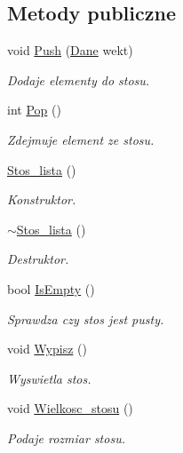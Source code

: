 \subsection*{\-Metody publiczne}
\begin{DoxyCompactItemize}
\item 
void \hyperlink{class_stos__lista_a0a12a6e3e6748a789e43934793917738}{\-Push} (\hyperlink{class_dane}{\-Dane} wekt)
\begin{DoxyCompactList}\small\item\em \-Dodaje elementy do stosu. \end{DoxyCompactList}\item 
int \hyperlink{class_stos__lista_a338593acee00448c8e9083b23363af63}{\-Pop} ()
\begin{DoxyCompactList}\small\item\em \-Zdejmuje element ze stosu. \end{DoxyCompactList}\item 
\hyperlink{class_stos__lista_ac7f453eea7c8f563d84068002c6c3d6d}{\-Stos\-\_\-lista} ()
\begin{DoxyCompactList}\small\item\em \-Konstruktor. \end{DoxyCompactList}\item 
\hyperlink{class_stos__lista_a2ea239a1b5c70eec5b5ae7fc770bf15a}{$\sim$\-Stos\-\_\-lista} ()
\begin{DoxyCompactList}\small\item\em \-Destruktor. \end{DoxyCompactList}\item 
bool \hyperlink{class_stos__lista_ac4a0dce20a28da4c373aeba1e3dc7524}{\-Is\-Empty} ()
\begin{DoxyCompactList}\small\item\em \-Sprawdza czy stos jest pusty. \end{DoxyCompactList}\item 
void \hyperlink{class_stos__lista_aff392523f7f8b2bad0d8da0d62fa8bac}{\-Wypisz} ()
\begin{DoxyCompactList}\small\item\em \-Wyswietla stos. \end{DoxyCompactList}\item 
void \hyperlink{class_stos__lista_adf575ec0963dc5c9e16c39503f390e77}{\-Wielkosc\-\_\-stosu} ()
\begin{DoxyCompactList}\small\item\em \-Podaje rozmiar stosu. \end{DoxyCompactList}\end{DoxyCompactItemize}


